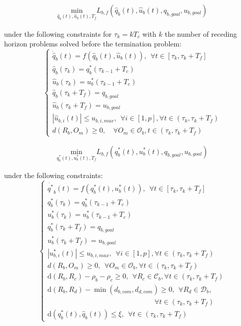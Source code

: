 \documentclass[eprint]{actapoly}
\begin{document}
\begin{align}\label{eq:costsa}
\underset{\hat{q}_b(t),\hat{u}_b(t),T_f}{\mathrm{min}} L_{b,f}(\hat{q}_b(t), \hat{u}_b(t), q_{b,goal},u_{b,goal})
\end{align}

under the following constraints for $\tau_k = kT_c$ with $k$ the number of receding horizon
problems solved before the termination problem:
\begin{equation}\label{eq:constsa}
\left\lbrace\begin{array}{lcl}
    \dot{\hat{q}}_b(t) = f(\hat{q}_b(t),\hat{u}_b(t)),\ \ \forall t \in [\tau_{k}, \tau_{k}+T_f]\\
    \hat{q}_b(\tau_{k}) = q^*_{b}(\tau_{k-1}+T_c)\\
    \hat{u}_b(\tau_{k}) = u^*_{b}(\tau_{k-1}+T_c)\\
    \hat{q}_b(\tau_{k}+T_f) = q_{b,goal}\\
    \hat{u}_b(\tau_{k}+T_f) = u_{b,goal}\\
    |\hat{u}_{b,i}(t)| \leq u_{b,i,max},\ \ \forall i \in [1,p],\forall t \in (\tau_{k}, \tau_{k}+T_f)\\
    d(R_b, O_m) \geq 0,\quad \forall O_m \in \mathcal{O}_b, t \in (\tau_{k}, \tau_{k}+T_f)
\end{array}\right.
\end{equation}

\begin{align}\label{eq:cost}
\underset{q^*_b(t),u^*_b(t),T_f}{\mathrm{min}} L_{b,f}(q^*_b(t), u^*_b(t), q_{b,goal},u_{b,goal})
\end{align}

under the following constraints:
\begin{equation}\label{eq:const}
\left\lbrace\begin{array}{lcl}
    \dot{q^*}_b(t) = f(q^*_b(t),u^*_b(t)),\ \ \forall t \in [\tau_{k}, \tau_{k}+T_f]\\
    q^*_b(\tau_{k}) = q^*_{b}(\tau_{k-1}+T_c)\\
    u^*_b(\tau_{k}) = u^*_{b}(\tau_{k-1}+T_c)\\
    q^*_b(\tau_{k}+T_f) = q_{b,goal}\\
    u^*_b(\tau_{k}+T_f) = u_{b,goal}\\
    |u^*_{b,i}(t)| \leq u_{b,i,max},\ \ \forall i \in [1,p],\forall t \in (\tau_{k}, \tau_{k}+T_f)\\
    d(R_b, O_m) \geq 0,\ \ \forall O_m \in \mathcal{O}_b, \forall t \in (\tau_{k}, \tau_{k}+T_f)\\
    \mathrm{d}(R_b, R_c) - \rho_b - \rho_c \geq 0,\ \ \forall R_c \in \mathcal{C}_b, \forall t \in (\tau_{k}, \tau_{k}+T_f)\\
    \mathrm{d}(R_b, R_d) - \min(d_{b,com},d_{d,com}) \geq 0,\ \ \forall R_d \in \mathcal{D}_b,\\
    \quad \quad \quad \quad \quad \quad \quad \quad \quad \quad \quad \quad \quad \quad \quad \forall t \in (\tau_{k}, \tau_{k}+T_f)\\
    \mathrm{d}(q^*_b(t), \hat{q}_b(t)) \leq \xi,\ \ \forall t \in (\tau_{k}, \tau_{k}+T_f)
\end{array}\right.
\end{equation}
\end{document}
